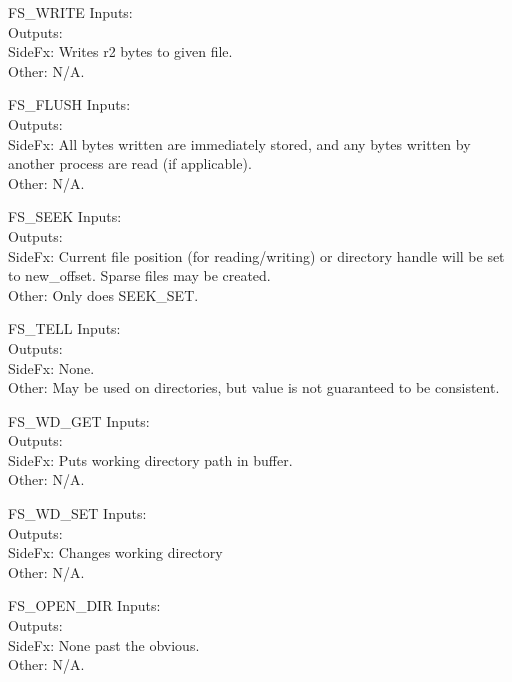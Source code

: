 \begin{sccall}{FS\_WRITE}
  Inputs: \\
 Outputs: \\
  SideFx: Writes r2 bytes to given file.\\
   Other: N/A.
\end{sccall}
\begin{sccall}{FS\_FLUSH}
  Inputs: \\
 Outputs: \scargs{}\\
  SideFx: All bytes written are immediately stored, and any bytes written by another process are read (if applicable).\\
   Other: N/A.
\end{sccall}
\begin{sccall}{FS\_SEEK}
  Inputs: \\
 Outputs: \scargs{}\\
  SideFx: Current file position (for reading/writing) or directory handle will be set to new\_offset. Sparse files may be created.\\
   Other: Only does SEEK\_SET.
\end{sccall}
\begin{sccall}{FS\_TELL}
  Inputs: \\
 Outputs: \\
  SideFx: None.\\
   Other: May be used on directories, but value is not guaranteed to be consistent.
\end{sccall}
\begin{sccall}[]{FS\_WD\_GET}
  Inputs: \\
 Outputs: \\
  SideFx: Puts working directory path in buffer.\\
   Other: N/A.
\end{sccall}
\begin{sccall}[]{FS\_WD\_SET}
  Inputs: \\
 Outputs: \scargs{}\\
  SideFx: Changes working directory\\
   Other: N/A.
\end{sccall}
\begin{sccall}[]{FS\_OPEN\_DIR}
  Inputs: \\
 Outputs: \\
  SideFx: None past the obvious.\\
   Other: N/A.
\end{sccall}
